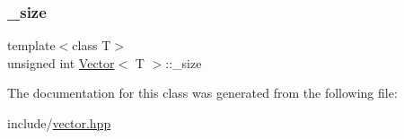 \mbox{\label{classVector_acb6320b3ff4bf32733fbf0c279d8f895_acb6320b3ff4bf32733fbf0c279d8f895}} 
\subsubsection{\texorpdfstring{\+\_\+size}{\_size}}
{\footnotesize\ttfamily template$<$class T$>$ \\
unsigned int \hyperlink{classVector}{Vector}$<$ T $>$\+::\+\_\+size\hspace{0.3cm}{\ttfamily [private]}}



The documentation for this class was generated from the following file\+:\begin{DoxyCompactItemize}
\item 
include/\hyperlink{vector_8hpp}{vector.\+hpp}\end{DoxyCompactItemize}
